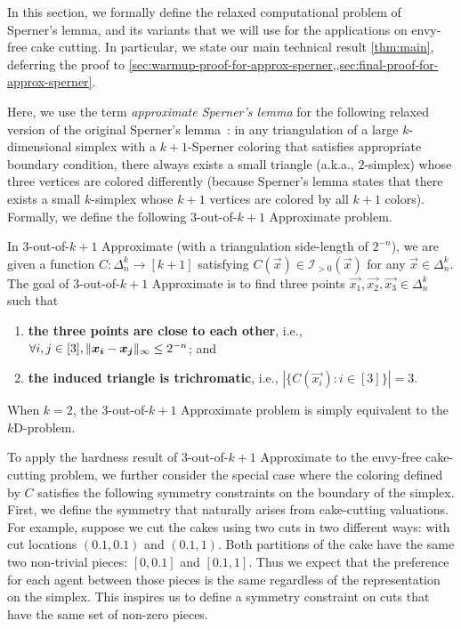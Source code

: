 \newcommand{\outofk}{{$3$-out-of-$k\!+\!1$}\xspace}

In this section, we formally define the relaxed computational problem of Sperner's lemma, and its variants that we will use for the applications on envy-free cake cutting.  
In particular, we state our main technical result \cref{thm:main}, deferring the proof to \cref{sec:warmup-proof-for-approx-sperner,,sec:final-proof-for-approx-sperner}.

Here, we use the term {\em approximate Sperner's lemma} for the following relaxed version of the original Sperner's lemma~\cite{sperner1928neuer}: in any triangulation of a large $k$-dimensional simplex with a $k+1$-Sperner coloring that satisfies appropriate boundary condition, there always exists a small triangle (a.k.a., $2$-simplex) whose three vertices are colored differently (because Sperner's lemma states that there exists a small $k$-simplex whose $k+1$ vertices are colored by all $k+1$ colors).
Formally, we define the following \outofk Approximate \Sperner problem. 


\begin{definition}[\outofk Approximate \Sperner]\label{def:approx-kdsperner}
    In \outofk Approximate \Sperner (with a triangulation side-length of $2^{-n}$), we are given a function 
    $C:\Delta^k_n \to [k+1]$ satisfying $C(\vec{x}) \in \mathcal{I}_{>0}(\vec{x})$ for any $\vec{x}\in \Delta^k_n$.
    The goal of \outofk Approximate \Sperner is to find three points $\vec{x_1},\vec{x_2}, \vec{x_3}\in \Delta_n^k$ such that
    \begin{enumerate}[itemsep=0.2em,topsep=0.5em]
        \item {\bf the three points are close to each other}, i.e., $\forall i,j\in [3], \| {\boldsymbol{x_i}-\boldsymbol{x_j}} \|_{\infty}\leq 2^{-n}$; and 
        \item {\bf the induced triangle is trichromatic}, i.e., $|\{C(\vec{x_i}): i\in [3]\}|=3$.
    \end{enumerate}
\end{definition} 

\begin{remark}
    \label{remark:equiv-at-2}
    When $k=2$, the \outofk Approximate \Sperner problem is simply equivalent to the $k${\rm D}-\Sperner problem.
\end{remark}
    
To apply the hardness result of \outofk Approximate \Sperner to the envy-free cake-cutting problem, we further consider the special case 
where the coloring defined by $C$ satisfies the following symmetry constraints on the boundary of the simplex. 
First, we define the symmetry that naturally arises from cake-cutting valuations.
For example, suppose we cut the cakes using two cuts in two different ways: with cut locations $(0.1, 0.1)$ and $(0.1, 1)$. Both partitions of the cake have the same two non-trivial pieces: $[0,0.1]$ and $[0.1,1]$. Thus we expect that the preference for each agent between those pieces is the same regardless of the representation on the simplex. 
This inspires us to define a symmetry constraint on cuts that have the same set of non-zero pieces.


